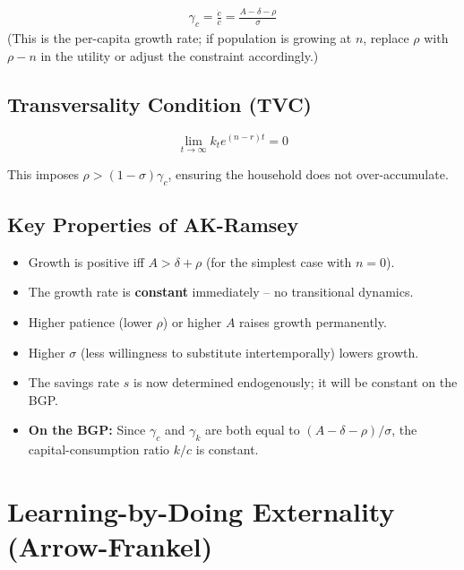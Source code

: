 \documentclass[a4paper,11pt]{article}
\begin{document}
\begin{resultbox}
\begin{align*}
\boxed{\gamma_c = \frac{\dot{c}}{c} = \frac{A - \delta - \rho}{\sigma}}
\tag{AK-Ramsey Euler}
\end{align*}
(This is the per-capita growth rate; if population is growing at $n$, replace $\rho$ with $\rho - n$ in the utility or adjust the constraint accordingly.)
\end{resultbox}

\subsection*{Transversality Condition (TVC)}

\[
\lim_{t \to \infty} k_t e^{(n - r)t} = 0
\]

This imposes $\rho > (1 - \sigma)\gamma_c$, ensuring the household does not over-accumulate.

\subsection*{Key Properties of AK-Ramsey}

\begin{itemize}
    \item Growth is positive iff $A > \delta + \rho$ (for the simplest case with $n = 0$).
    \item The growth rate is \textbf{constant} immediately -- no transitional dynamics.
    \item Higher patience (lower $\rho$) or higher $A$ raises growth permanently.
    \item Higher $\sigma$ (less willingness to substitute intertemporally) lowers growth.
    \item The savings rate $s$ is now determined endogenously; it will be constant on the BGP.
    \item \textbf{On the BGP:} Since $\gamma_c$ and $\gamma_k$ are both equal to $(A - \delta - \rho)/\sigma$, the capital-consumption ratio $k/c$ is constant.
\end{itemize}

\clearpage

\section{Learning-by-Doing Externality (Arrow-Frankel)}
\end{document}
